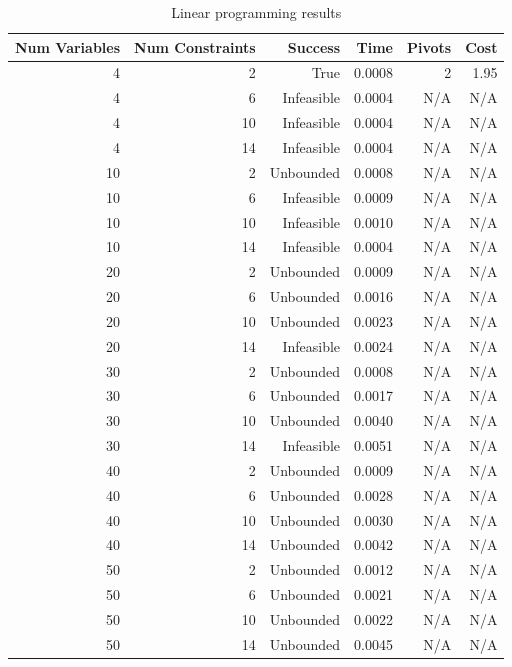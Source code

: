 \begin{table}[ht]
    \centering
    \begin{tabular}{rrrrrr}
        \toprule
        Num Variables & Num Constraints & Success & Time & Pivots & Cost \\
        \midrule
        4 & 2 & True & 0.0008 & 2 & 1.95 \\
		4 & 6 & Infeasible & 0.0004 & N/A & N/A \\
		4 & 10 & Infeasible & 0.0004 & N/A & N/A \\
		4 & 14 & Infeasible & 0.0004 & N/A & N/A \\
		10 & 2 & Unbounded & 0.0008 & N/A & N/A \\
		10 & 6 & Infeasible & 0.0009 & N/A & N/A \\
		10 & 10 & Infeasible & 0.0010 & N/A & N/A \\
		10 & 14 & Infeasible & 0.0004 & N/A & N/A \\
		20 & 2 & Unbounded & 0.0009 & N/A & N/A \\
		20 & 6 & Unbounded & 0.0016 & N/A & N/A \\
		20 & 10 & Unbounded & 0.0023 & N/A & N/A \\
		20 & 14 & Infeasible & 0.0024 & N/A & N/A \\
		30 & 2 & Unbounded & 0.0008 & N/A & N/A \\
		30 & 6 & Unbounded & 0.0017 & N/A & N/A \\
		30 & 10 & Unbounded & 0.0040 & N/A & N/A \\
		30 & 14 & Infeasible & 0.0051 & N/A & N/A \\
		40 & 2 & Unbounded & 0.0009 & N/A & N/A \\
		40 & 6 & Unbounded & 0.0028 & N/A & N/A \\
		40 & 10 & Unbounded & 0.0030 & N/A & N/A \\
		40 & 14 & Unbounded & 0.0042 & N/A & N/A \\
		50 & 2 & Unbounded & 0.0012 & N/A & N/A \\
		50 & 6 & Unbounded & 0.0021 & N/A & N/A \\
		50 & 10 & Unbounded & 0.0022 & N/A & N/A \\
		50 & 14 & Unbounded & 0.0045 & N/A & N/A \\
        \bottomrule
    \end{tabular}
    \caption{Linear programming results}
    \label{tab:lp-results}
\end{table}